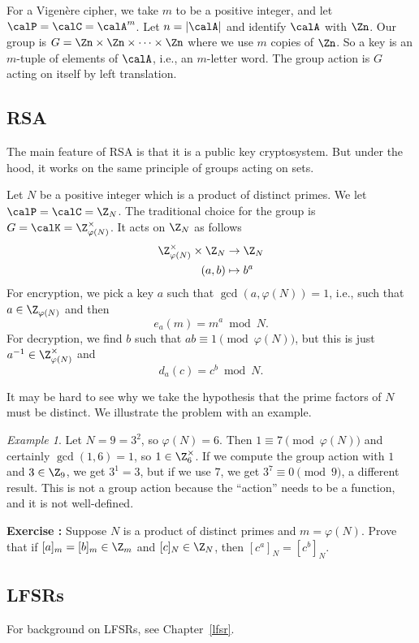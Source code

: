 \documentclass[12pt]{amsart}
\newcounter{probs}
\newenvironment{prob}{%
  \refstepcounter{probs}
  \par\medskip\noindent\textbf{Exercise \theprobs:} }{\par\medskip}
\theoremstyle{plain}
\theoremstyle{definition}
\theoremstyle{remark}
\newtheorem*{exam}{Example}
\begin{document}
For a Vigen\`ere cipher, we take $m$ to be a positive integer, and let
$\calP=\calC=\calA^m$.  Let $n=|\calA|$ and identify $\calA$ with
$\Zn$.  Our group is $G=\Zn\times\Zn\times\cdots \times \Zn$ where we
use $m$ copies of $\Zn$.  So a key is an $m$-tuple of elements of
$\calA$, i.e., an $m$-letter word.  The group action is $G$ acting on
itself by left translation.

\subsection{RSA}
The main feature of RSA is that it is a public key cryptosystem.  But
under the hood, it works on the same principle of groups acting on
sets.

Let $N$ be a positive integer which is a product of distinct primes.
We let $\calP=\calC=\Z_N$.  The traditional choice for the group is
$G=\calK=\Z_{\varphi(N)}^\times$.  It acts on $\Z_N$ as follows
\begin{align*}
\Z_{\varphi(N)}^\times\times\Z_N &\to \Z_N   \\
(a, b) &\mapsto b^a
\end{align*}
For encryption, we pick a key $a$ such that $\gcd(a, \varphi(N))=1$,
i.e., such that $a\in\Z_{\varphi(N)}$ and then
\[ e_a(m) = m^a \bmod N.\]
For decryption, we find $b$ such that $ab\equiv 1\pmod{\varphi(N)}$,
but this is just $a^{-1}\in\Z_{\varphi(N)}^\times$ and
\[ d_a(c) = c^b\bmod N.\]

It may be hard to see why we take the hypothesis that the prime
factors of $N$ must be distinct.  We illustrate the problem with an
example.
\begin{exam}
  Let $N=9=3^2$, so $\varphi(N) = 6$.  Then $1\equiv 7
  \pmod{\varphi(N)}$ and certainly $\gcd(1,6)=1$, so $1\in
  \Z_6^\times$.  If we compute the group action with $1$ and
  $3\in\Z_9$, we get $3^1=3$, but if we use $7$, we get $3^7\equiv
  0\pmod 9$, a different result.  This is not a group action because
  the ``action'' needs to be a function, and it is not well-defined.
\end{exam} 
\begin{prob}
  Suppose $N$ is a product of distinct primes and $m=\varphi(N)$.
  Prove that if $[a]_m=[b]_m\in\Z_m$ and $[c]_N\in\Z_N$, then $[c^a]_N=[c^b]_N$. 
\end{prob}

\subsection{LFSRs}
For background on LFSRs, see Chapter~\ref{lfsr}.  
\end{document}
